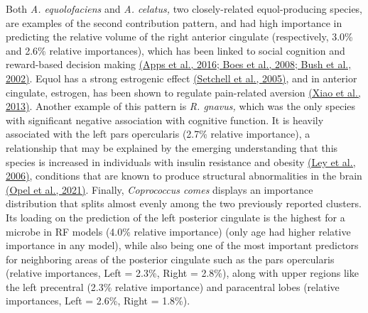 Both \emph{A. equolofaciens} and \emph{A. celatus,} two closely-related
equol-producing species, are examples of the second contribution
pattern, and had high importance in predicting the relative volume of
the right anterior cingulate (respectively, 3.0\% and 2.6\% relative
importances), which has been linked to social cognition and reward-based
decision making \href{https://www.zotero.org/google-docs/?Wi8Bpq}{(Apps
et al., 2016; Boes et al., 2008; Bush et al., 2002)}. Equol has a strong
estrogenic effect
\href{https://www.zotero.org/google-docs/?PqgFU7}{(Setchell et al.,
2005)}, and in anterior cingulate, estrogen, has been shown to regulate
pain-related aversion
\href{https://www.zotero.org/google-docs/?5huRIR}{(Xiao et al., 2013)}.
Another example of this pattern is \emph{R. gnavus,} which was the only
species with significant negative association with cognitive function.
It is heavily associated with the left pars opercularis (2.7\% relative
importance), a relationship that may be explained by the emerging
understanding that this species is increased in individuals with insulin
resistance and obesity
\href{https://www.zotero.org/google-docs/?lwzWUv}{(Ley et al., 2006)},
conditions that are known to produce structural abnormalities in the
brain \href{https://www.zotero.org/google-docs/?NlkFr6}{(Opel et al.,
2021)}. Finally, \emph{Coprococcus comes} displays an importance
distribution that splits almost evenly among the two previously reported
clusters. Its loading on the prediction of the left posterior cingulate
is the highest for a microbe in RF models (4.0\% relative importance)
(only age had higher relative importance in any model), while also being
one of the most important predictors for neighboring areas of the
posterior cingulate such as the pars opercularis (relative importances,
Left = 2.3\%, Right = 2.8\%), along with upper regions like the left
precentral (2.3\% relative importance) and paracentral lobes (relative
importances, Left = 2.6\%, Right = 1.8\%).
